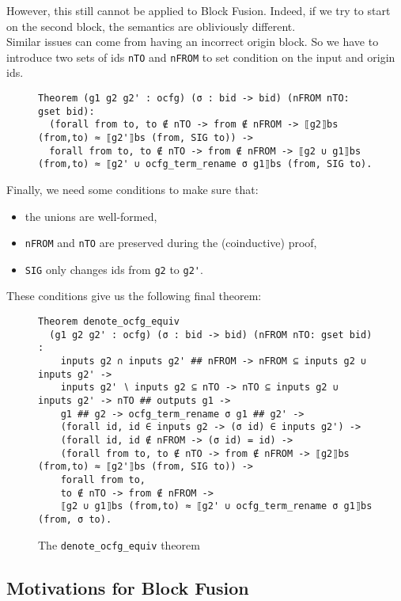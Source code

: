\documentclass[11pt]{article}
\newcommand{\inlinecoq}[1]{\mbox{\lstinline[style=customcoq,columns=fixed,basewidth=.48em]{#1}}}
\newcommand{\ilc}[1]{\inlinecoq{#1}}
\begin{document}
However, this still cannot be applied to Block Fusion. Indeed, if we try to start on the second block, the semantics are obliviously different.\\
Similar issues can come from having an incorrect origin block. So we have to introduce two sets of ids \ilc{nTO} and \ilc{nFROM} to set condition on the input and origin ids.\\
\begin{figure}[H]
  \begin{lstlisting}[style=customcoq,basicstyle=\small\ttfamily]
Theorem (g1 g2 g2' : ocfg) (σ : bid -> bid) (nFROM nTO: gset bid):
  (forall from to, to ∉ nTO -> from ∉ nFROM -> ⟦g2⟧bs (from,to) ≈ ⟦g2'⟧bs (from, SIG to)) ->
  forall from to, to ∉ nTO -> from ∉ nFROM -> ⟦g2 ∪ g1⟧bs (from,to) ≈ ⟦g2' ∪ ocfg_term_rename σ g1⟧bs (from, SIG to).
  \end{lstlisting}
\end{figure}

Finally, we need some conditions to make sure that:\begin{itemize}
  \item the unions are well-formed,
  \item \ilc{nFROM} and \ilc{nTO} are preserved during the (coinductive) proof,
  \item \ilc{SIG} only changes ids from \ilc{g2} to \ilc{g2'}.
\end{itemize}

These conditions give us the following final theorem:
\begin{figure}[H]
\begin{lstlisting}[style=customcoq,basicstyle=\small\ttfamily]
Theorem denote_ocfg_equiv
  (g1 g2 g2' : ocfg) (σ : bid -> bid) (nFROM nTO: gset bid) :
    inputs g2 ∩ inputs g2' ## nFROM -> nFROM ⊆ inputs g2 ∪ inputs g2' ->
    inputs g2' ∖ inputs g2 ⊆ nTO -> nTO ⊆ inputs g2 ∪ inputs g2' -> nTO ## outputs g1 ->
    g1 ## g2 -> ocfg_term_rename σ g1 ## g2' ->
    (forall id, id ∈ inputs g2 -> (σ id) ∈ inputs g2') ->
    (forall id, id ∉ nFROM -> (σ id) = id) ->
    (forall from to, to ∉ nTO -> from ∉ nFROM -> ⟦g2⟧bs (from,to) ≈ ⟦g2'⟧bs (from, SIG to)) ->
    forall from to,
    to ∉ nTO -> from ∉ nFROM ->
    ⟦g2 ∪ g1⟧bs (from,to) ≈ ⟦g2' ∪ ocfg_term_rename σ g1⟧bs (from, σ to).
  \end{lstlisting}
  \caption{The \ilc{denote_ocfg_equiv} theorem}
\end{figure}

\subsection{Motivations for Block Fusion}
\end{document}
